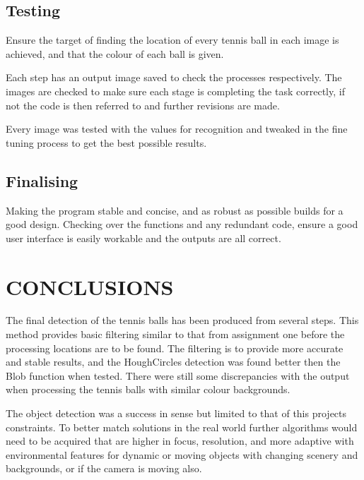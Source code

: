 \documentclass[a4paper, 10pt]{article}
\begin{document}
\clearpage
\subsection{Testing}

Ensure the target of finding the location of every tennis ball in each image is achieved, and that the colour of each ball is given.

Each step has an output image saved to check the processes respectively. The images are checked to make sure each stage is completing the task correctly, if not the code is then referred to and further revisions are made.

Every image was tested with the values for recognition and tweaked in the fine tuning process to get the best possible results.



\subsection{Finalising}

Making the program stable and concise, and as robust as possible builds for a good design. Checking over the functions and any redundant code, ensure a good user interface is easily workable and the outputs are all correct.


\section{CONCLUSIONS}

The final detection of the tennis balls has been produced from several steps. This method provides basic filtering similar to that from assignment one before the processing locations are to be found. The filtering is to provide more accurate and stable results, and the HoughCircles detection was found better then the Blob function when tested. There were still some discrepancies with the output when processing the tennis balls with similar colour backgrounds.

The object detection was a success in sense but limited to that of this projects constraints. To better match solutions in the real world further algorithms would need to be acquired that are higher in focus, resolution, and more adaptive with environmental features for dynamic or moving objects with changing scenery and backgrounds, or if the camera is moving also.
\end{document}
